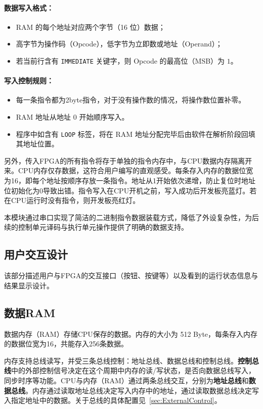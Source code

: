 \documentclass[lang=cn,a4paper,newtx]{elegantpaper}
\begin{document}
\paragraph{数据写入格式：}

\begin{itemize}
  \item RAM 的每个地址对应两个字节（16 位）数据；
  \item 高字节为操作码（Opcode），低字节为立即数或地址（Operand）；
  \item 若当前行含有 \texttt{IMMEDIATE} 关键字，则 Opcode 的最高位（MSB）为 $1$。
\end{itemize}

\paragraph{写入控制规则：}

\begin{itemize}
  \item 每一条指令都为2byte指令，对于没有操作数的情况，将操作数位置补零。
  \item RAM 地址从地址 0 开始顺序写入。
  \item 程序中如含有 \texttt{LOOP} 标签，将在 RAM 地址分配完毕后由软件在解析阶段回填其地址位置。
\end{itemize}

另外，传入FPGA的所有指令将存于单独的指令内存中，与CPU数据内存隔离开来。CPU内存仅存数据，这符合用户编写的直观感受。每条存入内存的数据位宽为16，即每个地址按顺序存放一条指令。地址从1开始依次递增，防止复位时地址位初始化为0导致出错。指令写入在CPU开机之前，写入成功后开发板亮蓝灯。若在CPU运行时没有指令，则开发板亮红灯。

本模块通过串口实现了简洁的二进制指令数据装载方式，降低了外设复杂性，为后续的控制单元译码与执行单元操作提供了明确的数据支持。

\subsection{用户交互设计}\label{sec:interaction}
该部分描述用户与FPGA的交互接口（按钮、按键等）以及看到的运行状态信息与结果显示设计。
\subsection{数据RAM}
数据内存（RAM）存储CPU保存的数据。内存的大小为 512 Byte，每条存入内存的数据位宽为16，共能存入256条数据。

内存支持总线读写，并受三条总线控制：地址总线、数据总线和控制总线。\textbf{控制总线}中的外部控制信号决定在这个周期中内存的读/写状态，是否向数据总线写入，同步时序等功能。CPU与内存（RAM）通过两条总线交互，分别为\textbf{地址总线}和\textbf{数据总线}。内存通过读取地址总线决定写入内存中的地址，通过读取数据总线决定写入指定地址中的数据。关于总线的具体配置见~\ref{sec:ExternalControl}。
\end{document}
